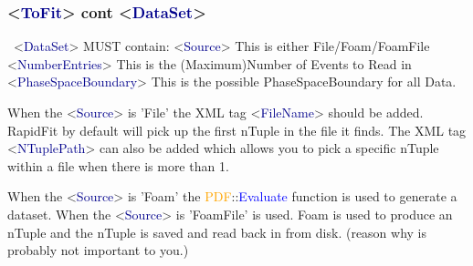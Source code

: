 \documentclass{beamer}
\begin{document}
\begin{frame}
\frametitle{<\textcolor{darkblue}{ToFit}> cont <\textcolor{darkblue}{DataSet}>}
\scriptsize~<\textcolor{darkblue}{DataSet}> MUST contain:\newline
<\textcolor{darkblue}{Source}>\newline
This is either File/Foam/FoamFile\newline
<\textcolor{darkblue}{NumberEntries}>\newline
This is the (Maximum)Number of Events to Read in\newline
<\textcolor{darkblue}{PhaseSpaceBoundary}>\newline
This is the possible PhaseSpaceBoundary for all Data.\newline

When the <\textcolor{darkblue}{Source}> is 'File' the XML tag <\textcolor{darkblue}{FileName}> should be added.\newline
RapidFit by default will pick up the first nTuple in the file it finds.\newline
The XML tag <\textcolor{darkblue}{NTuplePath}> can also be added which allows you to pick a specific nTuple within a file when there is more than 1.\newline

When the <\textcolor{darkblue}{Source}> is 'Foam' the \textcolor{orange}{PDF}::\textcolor{blue}{Evaluate} function is used to generate a dataset.\newline
When the <\textcolor{darkblue}{Source}> is 'FoamFile' is used. Foam is used to produce an nTuple and the nTuple is saved and read back in from disk. (reason why is probably not important to you.)

\end{frame}
\end{document}
